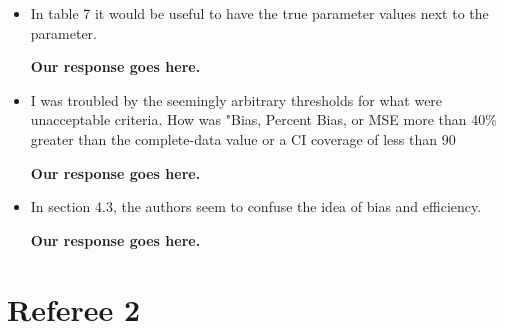 \documentclass[letterpaper,12pt]{article}
\begin{document}
\begin{itemize}
{\bf Our response goes here.}

\item In table 7 it would be useful to have the true parameter values next to the parameter.

{\bf Our response goes here.}

\item I was troubled by the seemingly arbitrary thresholds for what were unacceptable criteria. How was "Bias, Percent Bias, or MSE more than 40\% greater than the complete-data value or a CI coverage of less than 90%

{\bf Our response goes here.}

\item In section 4.3, the authors seem to confuse the idea of bias and efficiency.

{\bf Our response goes here.}
\end{itemize}

\section{Referee 2}
\end{document}

